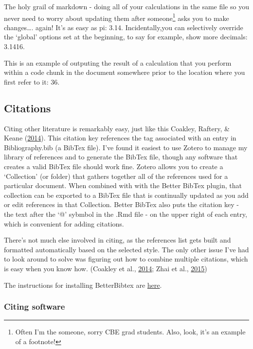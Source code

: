 \documentclass[]{elsarticle} %
\begin{document}
The holy grail of markdown - doing all of your calculations in the same
file so you never need to worry about updating them after
someone\footnote{Often I'm the someone, sorry CBE grad students. Also,
  look, it's an example of a footnote!} asks you to make
changes\ldots{}. again! It's as easy as pi: 3.14. Incidentally,you can
selectively override the `global' options set at the beginning, to say
for example, show more decimals: 3.1416.

This is an example of outputing the result of a calculation that you
perform within a code chunk in the document somewhere prior to the
location where you first refer to it: 36.

\subsection{Citations}\label{citations}

Citing other literature is remarkably easy, just like this Coakley,
Raftery, \& Keane
(\protect\hyperlink{ref-coakleyReviewMethodsMatch2014}{2014}). This
citation key references the tag associated with an entry in
Bibliography.bib (a BibTex file). I've found it easiest to use Zotero to
manage my library of references and to generate the BibTex file, though
any software that creates a valid BibTex file should work fine. Zotero
allows you to create a `Collection' (or folder) that gathers together
all of the references used for a particular document. When combined with
with the Better BibTex plugin, that collection can be exported to a
BibTex file that is continually updated as you add or edit references in
that Collection. Better BibTex also puts the citation key - the text
after the `@' sybmbol in the .Rmd file - on the upper right of each
entry, which is convenient for adding citations.

There's not much else involved in citing, as the references list gets
built and formatted automatically based on the selected style. The only
other issue I've had to look around to solve was figuring out how to
combine multiple citations, which is easy when you know how. (Coakley et
al., \protect\hyperlink{ref-coakleyReviewMethodsMatch2014}{2014}; Zhai
et al., \protect\hyperlink{ref-zhaiHumanComfortPerceived2015a}{2015})

The instructions for installing BetterBibtex are
\href{https://retorque.re/zotero-better-bibtex/}{here}.

\subsubsection{Citing software}\label{citing-software}
\end{document}
